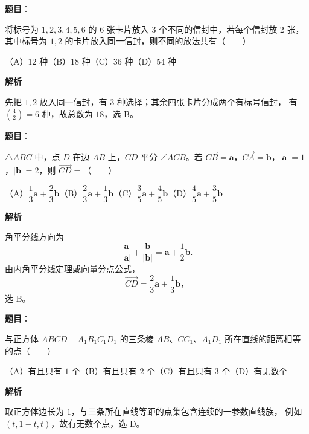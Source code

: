 \begin{answer}

\textbf{题目}：

将标号为 $1,2,3,4,5,6$ 的 $6$ 张卡片放入 $3$ 个不同的信封中，若每个信封放 $2$ 张，其中标号为 $1,2$ 的卡片放入同一信封，则不同的放法共有\mbox{（　　）}

（A）$12$ 种\quad（B）$18$ 种\quad（C）$36$ 种\quad（D）$54$ 种

\textbf{解析}

先把 $1,2$ 放入同一信封，有 $3$ 种选择；其余四张卡片分成两个有标号信封，
有 $\binom42=6$ 种，故总数为 $18$，选 B。


\end{answer}
\begin{answer}

\textbf{题目}：

$\triangle ABC$ 中，点 $D$ 在边 $AB$ 上，$CD$ 平分 $\angle ACB$。若 $\overrightarrow{CB}=\boldsymbol a$，$\overrightarrow{CA}=\boldsymbol b$，$|\boldsymbol a|=1$，$|\boldsymbol b|=2$，则 $\overrightarrow{CD}=$\mbox{（　　）}

（A）$\dfrac13\boldsymbol a+\dfrac23\boldsymbol b$\quad（B）$\dfrac23\boldsymbol a+\dfrac13\boldsymbol b$\quad（C）$\dfrac35\boldsymbol a+\dfrac45\boldsymbol b$\quad（D）$\dfrac45\boldsymbol a+\dfrac35\boldsymbol b$

\textbf{解析}

角平分线方向为
\nopagebreak[4]
\[
\frac{\boldsymbol a}{|\boldsymbol a|}+\frac{\boldsymbol b}{|\boldsymbol b|}
=\boldsymbol a+\frac12\boldsymbol b.
\]
由内角平分线定理或向量分点公式，
\nopagebreak[4]
\[
\overrightarrow{CD}=\frac23\boldsymbol a+\frac13\boldsymbol b\text{，}
\]
选 B。


\end{answer}
\begin{answer}

\textbf{题目}：

与正方体 $ABCD-A_1B_1C_1D_1$ 的三条棱 $AB\text{、}CC_1\text{、}A_1D_1$ 所在直线的距离相等的点\mbox{（　　）}

（A）有且只有 $1$ 个\quad（B）有且只有 $2$ 个\quad（C）有且只有 $3$ 个\quad（D）有无数个

\textbf{解析}

取正方体边长为 $1$，与三条所在直线等距的点集包含连续的一参数直线族，
例如 $(t,1-t,t)$，故有无数个点，选 D。


\end{answer}
